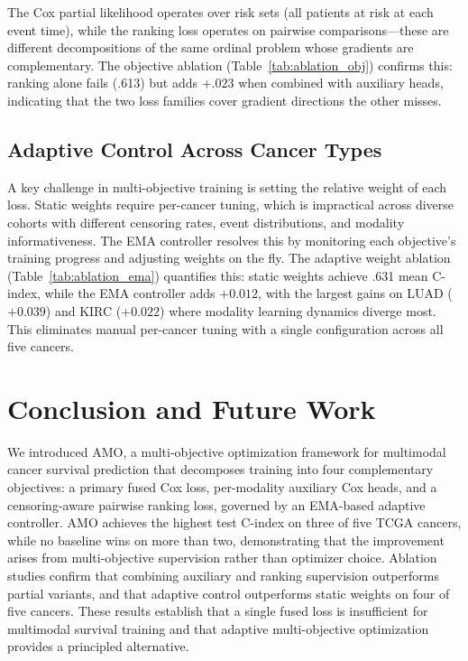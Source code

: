 \documentclass[10pt,twocolumn,letterpaper]{article}
\begin{document}
The Cox partial likelihood operates over risk sets (all patients at
risk at each event time), while the ranking loss operates on pairwise
comparisons---these are different decompositions of the same ordinal
problem whose gradients are complementary. The objective ablation
(Table~\ref{tab:ablation_obj}) confirms this: ranking alone fails
(.613) but adds $+.023$ when combined with auxiliary heads, indicating
that the two loss families cover gradient directions the other misses.

\subsection{Adaptive Control Across Cancer Types}

A key challenge in multi-objective training is setting the
relative weight of each loss. Static weights require per-cancer
tuning, which is impractical across diverse cohorts with different
censoring rates, event distributions, and modality informativeness.
The EMA controller resolves this by monitoring each objective's
training progress and adjusting weights on the fly.
The adaptive weight ablation (Table~\ref{tab:ablation_ema})
quantifies this: static weights achieve .631 mean
C-index, while the EMA controller adds $+0.012$, with the
largest gains on LUAD ($+0.039$) and KIRC ($+0.022$) where
modality learning dynamics diverge most. This eliminates manual
per-cancer tuning with a single configuration across all five cancers.

\section{Conclusion and Future Work}

We introduced AMO, a multi-objective optimization framework for
multimodal cancer survival prediction that decomposes training into
four complementary objectives: a primary fused Cox loss,
per-modality auxiliary Cox heads, and a censoring-aware pairwise
ranking loss, governed by an EMA-based adaptive controller. AMO
achieves the highest test C-index on three of five TCGA
cancers, while no baseline wins on more than two, demonstrating
that the improvement arises from multi-objective supervision rather
than optimizer choice. Ablation studies confirm that combining auxiliary and ranking
supervision outperforms partial variants, and that adaptive control
outperforms static weights on four of five cancers. These results
establish that a single fused loss is insufficient for multimodal
survival training and that adaptive multi-objective optimization
provides a principled alternative.
\end{document}
